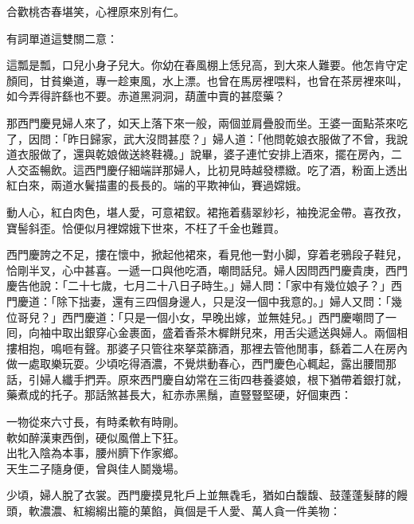 \begin{myquote} 
合歡桃杏春堪笑，心裡原來別有仁。
\end{myquote} 

有詞單道這雙關二意：

\begin{myquote} 
這瓢是瓢，口兒小身子兒大。你幼在春風棚上恁兒高，到大來人難要。他怎肯守定顏囘，甘貧樂道，專一趁東風，水上漂。也曾在馬房裡喂料，也曾在茶房裡來叫，如今弄得許繇也不要。赤道黑洞洞，葫蘆中賣的甚麼藥？
\end{myquote} 

那西門慶見婦人來了，如天上落下來一般，兩個並肩疊股而坐。王婆一面點茶來吃了，因問：「昨日歸家，武大沒問甚麼？」婦人道：「他問乾娘衣服做了不曾，我說道衣服做了，還與乾娘做送終鞋襪。」說畢，婆子連忙安排上酒來，擺在房內，二人交盃暢飲。這西門慶仔細端詳那婦人，比初見時越發標緻。吃了酒，粉面上透出紅白來，兩道水鬢描畫的長長的。端的平欺神仙，賽過嫦娥。

\begin{myquote} 
動人心，紅白肉色，堪人愛，可意裙釵。裙拖着翡翠紗衫，袖挽泥金帶。喜孜孜，寶髻斜歪。恰便似月裡嫦娥下世來，不枉了千金也難買。

\end{myquote} 

西門慶誇之不足，摟在懷中，掀起他裙來，看見他一對小脚，穿着老鴉段子鞋兒，恰剛半叉，心中甚喜。一遞一口與他吃酒，嘲問話兒。婦人因問西門慶貴庚，西門慶告他說：「二十七歲，七月二十八日子時生。」婦人問：「家中有幾位娘子？」西門慶道：「除下拙妻，還有三四個身邊人，只是沒一個中我意的。」婦人又問：「幾位哥兒？」西門慶道：「只是一個小女，早晚出嫁，並無娃兒。」西門慶嘲問了一囘，向袖中取出銀穿心金裹面，盛着香茶木樨餅兒來，用舌尖遞送與婦人。兩個相摟相抱，鳴咂有聲。那婆子只管往來拏菜篩酒，那裡去管他閒事，繇着二人在房內做一處取樂玩耍。少頃吃得酒濃，不覺烘動春心，西門慶色心輒起，露出腰間那話，引婦人纖手捫弄。原來西門慶自幼常在三街四巷養婆娘，根下猶帶着銀打就，藥煮成的托子。那話煞甚長大，紅赤赤黑鬚，直豎豎堅硬，好個東西：

\begin{myquote} 
一物從來六寸長，有時柔軟有時剛。\\軟如醉漢東西倒，硬似風僧上下狂。\\出牝入陰為本事，腰州臍下作家鄉。\\天生二子隨身便，曾與佳人鬬幾場。{}
\end{myquote} 

少頃，婦人脫了衣裳。西門慶摸見牝戶上並無毳毛，猶如白馥馥、鼓蓬蓬髮酵的饅頭，軟濃濃、紅縐縐出籠的菓餡，眞個是千人愛、萬人貪一件美物：

